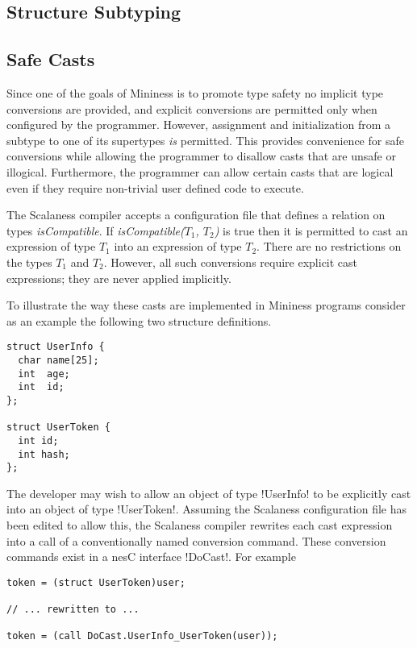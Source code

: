 \subsection{Structure Subtyping}
\label{section-structure-subtyping}


\subsection{Safe Casts}
\label{section-safe-casts}

Since one of the goals of Mininess is to promote type safety no implicit type conversions are
provided, and explicit conversions are permitted only when configured by the programmer.
However, assignment and initialization from a subtype to one of its supertypes \emph{is}
permitted. This provides convenience for safe conversions while allowing the programmer to
disallow casts that are unsafe or illogical. Furthermore, the programmer can allow certain casts
that are logical even if they require non-trivial user defined code to execute.

The Scalaness compiler accepts a configuration file that defines a relation on types
\textit{isCompatible}. If \textit{isCompatible($T_1$, $T_2$)} is true then it is permitted to
cast an expression of type $T_1$ into an expression of type $T_2$. There are no restrictions on
the types $T_1$ and $T_2$. However, all such conversions require explicit cast expressions; they
are never applied implicitly.

To illustrate the way these casts are implemented in Mininess programs consider as an example
the following two structure definitions.

\singlespace
\begin{lstlisting}[language=nesC]
struct UserInfo {
  char name[25];
  int  age;
  int  id;
};

struct UserToken {
  int id;
  int hash;
};
\end{lstlisting}
\primaryspacing

The developer may wish to allow an object of type !UserInfo! to be explicitly cast into an
object of type !UserToken!. Assuming the Scalaness configuration file has been edited to allow
this, the Scalaness compiler rewrites each cast expression into a call of a conventionally named
conversion command. These conversion commands exist in a nesC interface !DoCast!. For example

\singlespace
\begin{lstlisting}[language=nesC]
token = (struct UserToken)user;

// ... rewritten to ...

token = (call DoCast.UserInfo_UserToken(user));
\end{lstlisting}
\primaryspacing


